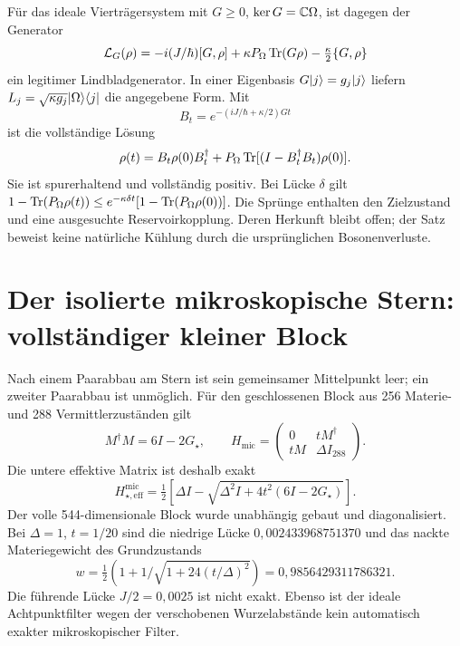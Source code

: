 Für das ideale Vierträgersystem mit $G\ge0$, $\ker G=\mathbb C\Omega$, ist dagegen der Generator
\begin{equation}
\mathcal L_G(\rho)=-i(J/\hbar)[G,\rho]
+\kappa P_\Omega\operatorname{Tr}(G\rho)-\tfrac{\kappa}{2}\{G,\rho\}
\end{equation}
ein legitimer Lindbladgenerator. In einer Eigenbasis $G\lvert j\rangle=g_j\lvert j\rangle$ liefern $L_j=\sqrt{\kappa g_j}\lvert\Omega\rangle\langle j\rvert$ die angegebene Form. Mit
\begin{equation}
B_t=e^{-(iJ/\hbar+\kappa/2)Gt}
\end{equation}
ist die vollständige Lösung
\begin{equation}
\rho(t)=B_t\rho(0)B_t^\dagger+
P_\Omega\operatorname{Tr}[(I-B_t^\dagger B_t)\rho(0)].
\end{equation}
Sie ist spurerhaltend und vollständig positiv. Bei Lücke $\delta$ gilt
$1-\operatorname{Tr}(P_\Omega\rho(t))\le e^{-\kappa\delta t}[1-\operatorname{Tr}(P_\Omega\rho(0))]$.
Die Sprünge enthalten den Zielzustand und eine ausgesuchte Reservoirkopplung. Deren Herkunft bleibt offen; der Satz beweist keine natürliche Kühlung durch die ursprünglichen Bosonenverluste.

\section{Der isolierte mikroskopische Stern: vollständiger kleiner Block}
Nach einem Paarabbau am Stern ist sein gemeinsamer Mittelpunkt leer; ein zweiter Paarabbau ist unmöglich. Für den geschlossenen Block aus 256 Materie- und 288 Vermittlerzuständen gilt
\begin{equation}
M^\dagger M=6I-2G_\star,\qquad
H_{\mathrm{mic}}=\begin{pmatrix}0&tM^\dagger\\tM&\Delta I_{288}\end{pmatrix}.
\end{equation}
Die untere effektive Matrix ist deshalb exakt
\begin{equation}
H_{\star,\mathrm{eff}}^{\mathrm{mic}}
=\tfrac12[\Delta I-\sqrt{\Delta^2I+4t^2(6I-2G_\star)}].
\end{equation}
Der volle 544-dimensionale Block wurde unabhängig gebaut und diagonalisiert. Bei $\Delta=1$, $t=1/20$ sind die niedrige Lücke $0{,}002433968751370$ und das nackte Materiegewicht des Grundzustands
\begin{equation}
w=\tfrac12(1+1/\sqrt{1+24(t/\Delta)^2})=0{,}9856429311786321.
\end{equation}
Die führende Lücke $J/2=0{,}0025$ ist nicht exakt. Ebenso ist der ideale Achtpunktfilter wegen der verschobenen Wurzelabstände kein automatisch exakter mikroskopischer Filter.

